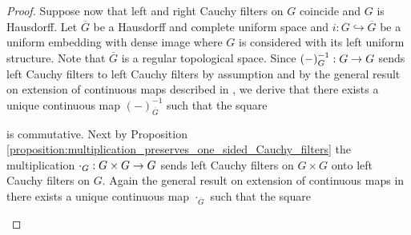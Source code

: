 \documentclass[10pt]{amsart}
\begin{document}
\begin{proof}
	Suppose now that left and right Cauchy filters on $G$ coincide and $G$ is Hausdorff. Let $\overline{G}$ be a Hausdorff and complete uniform space and $i:G\hookrightarrow \overline{G}$ be a uniform embedding with dense image where $G$ is considered with its left uniform structure. Note that $\overline{G}$ is a regular topological space. Since $(-)^{-1}_G:G\rightarrow G$ sends left Cauchy filters to left Cauchy filters by assumption and by the general result on extension of continuous maps described in \cite{Filters_in_topology}, we derive that there exists a unique continuous map $(-)^{-1}_{\overline{G}}$ such that the square
	\begin{center}
	\end{center}
	is commutative. Next by Proposition \ref{proposition:multiplication_preserves_one_sided_Cauchy_filters} the multiplication $\cdot_G:G\times G \rightarrow G$ sends left Cauchy filters on $G\times G$ onto left Cauchy filters on $G$. Again the general result on extension of continuous maps in \cite{Filters_in_topology} there exists a unique continuous map $\cdot_{\overline{G}}$ such that the square
	\begin{center}
\end{center}
\end{proof}
\end{document}
